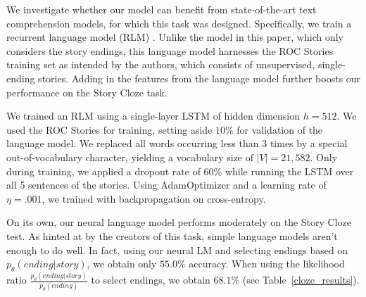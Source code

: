 \documentclass[11pt,a4paper]{article}
\newcommand{\tabref}[1]{Table~\ref{#1}}
\newcommand{\roy}[1]{\footnote{\color{red}{\textbf{Roy: #1}}}}
\begin{document}
We investigate whether our model can benefit from state-of-the-art text comprehension models, for which this task was designed. Specifically, we train a recurrent language model (RLM) \cite{mikolov2010recurrent}. %
Unlike the model in this paper, which only considers the story endings, this language model harnesses the ROC Stories training set as intended by the authors, which consists of unsupervised, single-ending stories. Adding in the features from the language model further boosts our performance on the Story Cloze task.


We trained an RLM using a single-layer LSTM \cite{hochreiter1997long} of hidden dimension $h=512$.
We used the ROC Stories for training, setting aside $10\%$ for validation of the language model. We replaced all words occurring less than 3 times by a special out-of-vocabulary character, yielding a vocabulary size of $|V|=21,582$.
Only during training, we applied a dropout rate of 60\% while running the LSTM over all 5 sentences of the stories. Using AdamOptimizer \cite{kingma2014adam} and a learning rate of $\eta=.001$, we trained with backpropagation on cross-entropy. %


On its own, our neural language model performs moderately on the Story Cloze test. As hinted at by the creators of this task, simple language models aren't enough to do well. In fact, using our neural LM and selecting endings based on $p_\theta(ending|story)$, we obtain only $55.0\%$ accuracy. When using the likelihood ratio $\frac{p_\theta(ending|story)}{p_\theta(ending)}$ to select endings, we obtain $68.1\%$ (see \tabref{cloze_results}).
\end{document}
